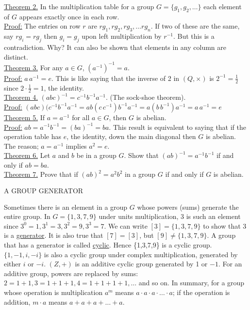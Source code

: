 \documentclass[12pt]{article}
\theoremstyle{definition}
\begin{document}
%
\underline{Theorem 2.}  In the multiplication table for a group $G=\{g_1,g_2,\dots\}$ each element of $G$ appears exactly once in each row.\\
\underline{Proof:} The entries on row $r$ are $rg_1, rg_2,rg_3,\dots rg_n.$  If two of these are the same, say $rg_i=rg_j$ then $g_i=g_j$ upon left multiplication by $r^{-1}$.  But this is  a contradiction.  Why?  It can also be shown that elements in any column are distinct.\\[.1in]
%
\underline{Theorem 3.} For any $a\in G$, $(a^{-1})^{-1}=a$.\\
\underline{Proof:} $a\,a^{-1} = e$.  This is like saying that the inverse of 2 in $(Q,\times)$ is $2^{-1} =\frac12$ since $2\cdot\frac12=1$, the identity.\\[.1in]
%
\underline{Theorem 4.} $(abc)^{-1}=c^{-1}b^{-1}a^{-1}$.  (The sock-shoe theorem).\\
\underline{Proof:} $(abc)(c^{-1}b^{-1}a^{-1}=ab(c\,c^{-1})b^{-1}a^{-1}=a(b\,b^{-1})a^{-1} = a\,a^{-1} = e$\\[.1in]
%
\underline{Theorem 5.} If $a=a^{-1}$ for all $a\in G$, then $G$ is abelian.\\
\underline{Proof:}  $ab=a^{-1}b^{-1}=(ba)^{-1}=ba$.  This result is equivalent to saying that if the operation table has $e$, the identity, down the main diagonal then $G$ is abelian.  The reason; $a=a^{-1}$ implies $a^2=e$.\\[.1in]
%
\underline{Theorem 6.} Let $a$ and $b$ be in a group $G$. Show that $(ab)^{-1} = a^{-1}b^{-1}$ if and only if $ab=ba$.\\[.1in]
%
\underline{Theorem 7.} Prove that if $(ab)^2=a^2b^2$ in a group $G$ if and only if $G$ is abelian.

\centerline{A GROUP GENERATOR}

Sometimes there is an element in a group $G$ whose powers (sums) generate the entire group.  In $G=\{1,3,7,9\}$ under units multiplication, 3 is such an element since $3^0=1, 3^1=3, 3^2=9, 3^3=7$.  We can write $[3]=\{1,3,7,9\}$ to show that 3 is a \underline{generator}.  It is also true that $[7]=[3]$, but $[9]\neq\{1,3,7,9\}$.  A group that has a generator is called \underline{cyclic}.  Hence \{1,3,7,9\} is a cyclic group. $\{1,-1,i,-i\}$ is also a cyclic group under complex multiplication, generated by either $i$ or $-i$.  $(Z,+)$ is an additive cyclic group generated by 1 or $-1$.  For an additive group, powers are replaced by sums: $2=1+1, 3=1+1+1, 4=1+1+1+1, \dots$ and so on.  In summary, for a group whose operation is multiplication $a^m$ means $a\cdot a \cdot a\cdot\dots\cdot a$; if the operation is addition, $m\cdot a$ means $a+a+a+\dots+a$.
\end{document}
